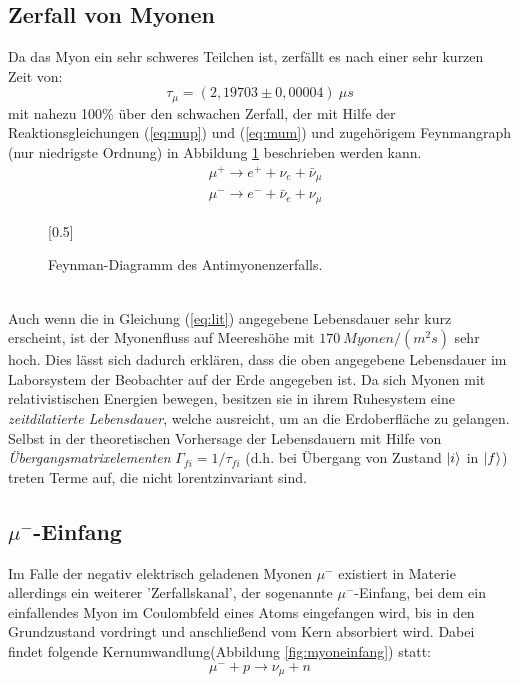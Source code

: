 	\subsection{Zerfall von Myonen}
	Da das Myon ein sehr schweres Teilchen ist, zerfällt es nach einer sehr kurzen Zeit von:\cite{PA}\\
		\begin{equation} \label{eq:lit}
			\tau_\mu = (2,19703 \pm 0,00004)\ \unit{\mu s}
		\end{equation}
	mit nahezu 100\% über den schwachen Zerfall, der mit Hilfe der Reaktionsgleichungen (\ref{eq:mup}) und (\ref{eq:mum}) und zugehörigem Feynmangraph (nur niedrigste Ordnung) in Abbildung \ref{fig:myonzerfall} beschrieben werden kann.\\
	
		\begin{align}
			&\mu^+ \longrightarrow e^+ + \nu_e + \bar{\nu}_\mu 		\label{eq:mup}\\
			&\mu^- \longrightarrow e^- + \bar{\nu}_e + \nu_\mu 		\label{eq:mum}
		\end{align}
		\begin{figure}[hp]
			\centering
			\scalebox{0.5}[0.5]{
			
			}
			\caption{Feynman-Diagramm des Antimyonenzerfalls.}
			\label{fig:myonzerfall}
		\end{figure}
	\ \\
	Auch wenn die in Gleichung (\ref{eq:lit}) angegebene Lebensdauer sehr kurz erscheint, ist der Myonenfluss auf Meereshöhe mit $170\ \unit{Myonen/(m^2s)}$ sehr hoch. Dies lässt sich dadurch erklären, dass die oben angegebene Lebensdauer im Laborsystem der Beobachter auf der Erde angegeben ist. Da sich Myonen mit relativistischen Energien bewegen, besitzen sie in ihrem Ruhesystem eine \textit{zeitdilatierte Lebensdauer}, welche ausreicht, um an die Erdoberfläche zu gelangen. Selbst in der theoretischen Vorhersage der Lebensdauern mit Hilfe von \textit{Übergangsmatrixelementen} $\Gamma_{fi} = 1/\tau_{fi}$ (d.h. bei Übergang von Zustand $\ket{i}$ in $\ket{f}$) treten Terme auf, die nicht lorentzinvariant sind.
	
	\subsection{$\mu^-$-Einfang}
	Im Falle der negativ elektrisch geladenen Myonen $\mu^-$ existiert in Materie allerdings ein weiterer 'Zerfallskanal', der sogenannte $\mu^-$-Einfang, bei dem ein einfallendes Myon im Coulombfeld eines Atoms eingefangen wird, bis in den Grundzustand vordringt und anschließend vom Kern absorbiert wird. Dabei findet folgende Kernumwandlung(Abbildung \ref{fig:myoneinfang}) statt:
		\begin{equation*}
			\mu^- + p \longrightarrow  \nu_\mu + n 
		\end{equation*}
		
